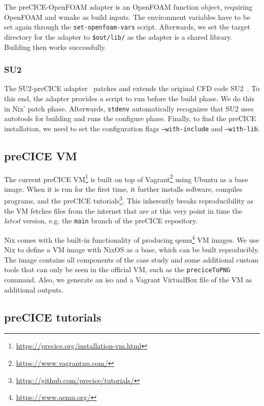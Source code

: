 \documentclass{eceasst}
\begin{document}
The preCICE-OpenFOAM adapter is an OpenFOAM function object, requiring OpenFOAM and wmake as build inputs.
The environment variables have to be set again through the \texttt{set-openfoam-vars} script.
Afterwards, we set the target directory for the adapter to \texttt{\$out/lib/} as the adapter is a shared library. Building then works successfully.

\subsubsection{SU2}

The SU2-preCICE adapter~\cite{Uekermann2017_Adapters} patches and extends the original CFD code SU2~\cite{su2}.
To this end, the adapter provides a script to run before the build phase.
We do this in Nix' patch phase. Afterwards, \texttt{stdenv} automatically recognizes that SU2 uses autotools for building and runs the configure phase.
Finally, to find the preCICE installation, we need to set the configuration flags \texttt{--with-include} and \texttt{--with-lib}.

\subsection{preCICE VM}

The current preCICE VM\footnote{\url{https://precice.org/installation-vm.html}} is built on top of Vagrant\footnote{\url{https://www.vagrantup.com/}} using Ubuntu as a base image.
When it is run for the first time, it further installs software, compiles programs, and the preCICE tutorials\footnote{\url{https://github.com/precice/tutorials/}}.
This inherently breaks reproducibility as the VM fetches files from the internet that are at this very point in time the \textit{latest} version, e.g. the \texttt{main} branch of the preCICE repository.

Nix comes with the built-in functionality of producing qemu\footnote{\url{https://www.qemu.org/}} VM images.
We use Nix to define a VM image with NixOS as a base, which can be built reproducibly.
The image contains all components of the case study and some additional custom tools that can only be seen in the official VM, such as the \texttt{preciceToPNG} command.
Also, we generate an iso and a Vagrant VirtualBox file of the VM as additional outputs.

\subsection{preCICE tutorials}
\end{document}
